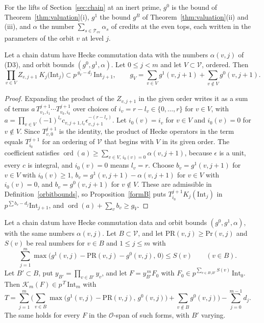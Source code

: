 For the lifts of Section~\ref{sec:chain} at an inert prime, $g^0$ is the bound of Theorem~\ref{thm:valuation}(i), $g^1$ the bound $g^B$ of Theorem~\ref{thm:valuation}(ii) and (iii), and $\alpha$ the number $\sum_{s\in\mathcal T_{\mathrm{ev}}}\alpha_s$ of credits at the even tops, each written in the parameters of the orbit $v$ at level $j$.

\begin{lemma}\label{ZLbound}
Let a chain datum have Hecke commutation data with the numbers $\alpha(v,j)$ of (D3), and orbit bounds $(g^0,g^1,\alpha)$. Let $0\le j<m$ and let $V\subset\mathcal V$, ordered. Then
\[
\prod_{v\in V}Z_{v,j+1}\ K_j\big(\mathrm{Int}_j\big)\subset p^{\,g_V-d_j}\,\mathrm{Int}_{j+1},\qquad g_V=\sum_{v\in V}g^1(v,j+1)+\sum_{v\notin V}g^0(v,j+1).
\]
\end{lemma}

\begin{proof}
Expanding the product of the $Z_{v,j+1}$ in the given order writes it as a sum of terms $a\,T^{j+1}_{v_1,i_1}\cdots T^{j+1}_{v_k,i_k}$ over choices of $i_v=r-l_v\in\{0,\dots,r\}$ for $v\in V$, with $a=\prod_{v\in V}(-1)^{l_v}c_{v,j+1,l_v}\epsilon_{v,j+1}^{-(r-l_v)}$. Let $i_0(v)=i_v$ for $v\in V$ and $i_0(v)=0$ for $v\notin V$. Since $T^{j+1}_{v,0}$ is the identity, the product of Hecke operators in the term equals $T^{j+1}_{i_0}$ for an ordering of $\mathcal V$ that begins with $V$ in its given order. The coefficient satisfies $\operatorname{ord}(a)\ge\sum_{v\in V,\,i_0(v)=0}\alpha(v,j+1)$, because $\epsilon$ is a unit, every $c$ is integral, and $i_0(v)=0$ means $l_v=r$. Choose $b_v=g^1(v,j+1)$ for $v\in V$ with $i_0(v)\ge1$, $b_v=g^1(v,j+1)-\alpha(v,j+1)$ for $v\in V$ with $i_0(v)=0$, and $b_v=g^0(v,j+1)$ for $v\notin V$. These are admissible in Definition~\ref{orbitbounds}, so Proposition~\ref{formB} puts $T^{j+1}_{i_0}K_j(\mathrm{Int}_j)$ in $p^{\sum b_v-d_j}\mathrm{Int}_{j+1}$, and $\operatorname{ord}(a)+\sum_vb_v\ge g_V$.
\end{proof}

\begin{theorem}\label{lowterm}
Let a chain datum have Hecke commutation data and orbit bounds $(g^0,g^1,\alpha)$, with the same numbers $\alpha(v,j)$. Let $B\subset\mathcal V$, and let $\mathrm{PR}(v,j)\ge\mathrm{Pr}(v,j)$ and $S(v)$ be real numbers for $v\in B$ and $1\le j\le m$ with
\begin{equation}\label{Sdef}
\sum_{j=1}^m\max\big(g^1(v,j)-\mathrm{PR}(v,j)-g^0(v,j),\,0\big)\le S(v)\qquad(v\in B).
\end{equation}
Let $B'\subset B$, put $y_{B'}=\prod_{v\in B'}y_v$, and let $F=y_{B'}^{\,m}F_0$ with $F_0\in p^{\sum_{v\in B\setminus B'}S(v)}\,\mathrm{Int}_0$. Then $\mathcal K_m(F)\in p^{\,T}\,\mathrm{Int}_m$ with
\[
T=\sum_{j=1}^m\Big(\sum_{v\in B}\max\big(g^1(v,j)-\mathrm{PR}(v,j),\,g^0(v,j)\big)+\sum_{v\notin B}g^0(v,j)\Big)-\sum_{j=0}^{m-1}d_j .
\]
The same holds for every $F$ in the $\mathcal O$-span of such forms, with $B'$ varying.
\end{theorem}

